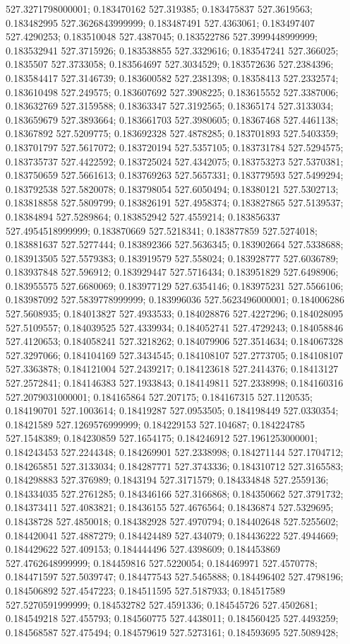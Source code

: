 527.3271798000001; 0.183470162 527.319385; 0.183475837 527.3619563; 0.183482995 527.3626843999999; 0.183487491 527.4363061; 0.183497407 527.4290253; 0.183510048 527.4387045; 0.183522786 527.3999448999999; 0.183532941 527.3715926; 0.183538855 527.3329616; 0.183547241 527.366025; 0.1835507 527.3733058; 0.183564697 527.3034529; 0.183572636 527.2384396; 0.183584417 527.3146739; 0.183600582 527.2381398; 0.18358413 527.2332574; 0.183610498 527.249575; 0.183607692 527.3908225; 0.183615552 527.3387006; 0.183632769 527.3159588; 0.18363347 527.3192565; 0.18365174 527.3133034; 0.183659679 527.3893664; 0.183661703 527.3980605; 0.18367468 527.4461138; 0.18367892 527.5209775; 0.183692328 527.4878285; 0.183701893 527.5403359; 0.183701797 527.5617072; 0.183720194 527.5357105; 0.183731784 527.5294575; 0.183735737 527.4422592; 0.183725024 527.4342075; 0.183753273 527.5370381; 0.183750659 527.5661613; 0.183769263 527.5657331; 0.183779593 527.5499294; 0.183792538 527.5820078; 0.183798054 527.6050494; 0.18380121 527.5302713; 0.183818858 527.5809799; 0.183826191 527.4958374; 0.183827865 527.5139537; 0.18384894 527.5289864; 0.183852942 527.4559214; 0.183856337 527.4954518999999; 0.183870669 527.5218341; 0.183877859 527.5274018; 0.183881637 527.5277444; 0.183892366 527.5636345; 0.183902664 527.5338688; 0.183913505 527.5579383; 0.183919579 527.558024; 0.183928777 527.6036789; 0.183937848 527.596912; 0.183929447 527.5716434; 0.183951829 527.6498906; 0.183955575 527.6680069; 0.183977129 527.6354146; 0.183975231 527.5566106; 0.183987092 527.5839778999999; 0.183996036 527.5623496000001; 0.184006286 527.5608935; 0.184013827 527.4933533; 0.184028876 527.4227296; 0.184028095 527.5109557; 0.184039525 527.4339934; 0.184052741 527.4729243; 0.184058846 527.4120653; 0.184058241 527.3218262; 0.184079906 527.3514634; 0.184067328 527.3297066; 0.184104169 527.3434545; 0.184108107 527.2773705; 0.184108107 527.3363878; 0.184121004 527.2439217; 0.184123618 527.2414376; 0.18413127 527.2572841; 0.184146383 527.1933843; 0.184149811 527.2338998; 0.184160316 527.2079031000001; 0.184165864 527.207175; 0.184167315 527.1120535; 0.184190701 527.1003614; 0.18419287 527.0953505; 0.184198449 527.0330354; 0.18421589 527.1269576999999; 0.184229153 527.104687; 0.184224785 527.1548389; 0.184230859 527.1654175; 0.184246912 527.1961253000001; 0.184243453 527.2244348; 0.184269901 527.2338998; 0.184271144 527.1704712; 0.184265851 527.3133034; 0.184287771 527.3743336; 0.184310712 527.3165583; 0.184298883 527.376989; 0.1843194 527.3171579; 0.184334848 527.2559136; 0.184334035 527.2761285; 0.184346166 527.3166868; 0.184350662 527.3791732; 0.184373411 527.4083821; 0.18436155 527.4676564; 0.18436874 527.5329695; 0.18438728 527.4850018; 0.184382928 527.4970794; 0.184402648 527.5255602; 0.184420041 527.4887279; 0.184424489 527.434079; 0.184436222 527.4944669; 0.184429622 527.409153; 0.184444496 527.4398609; 0.184453869 527.4762648999999; 0.184459816 527.5220054; 0.184469971 527.4570778; 0.184471597 527.5039747; 0.184477543 527.5465888; 0.184496402 527.4798196; 0.184506892 527.4547223; 0.184511595 527.5187933; 0.184517589 527.5270591999999; 0.184532782 527.4591336; 0.184545726 527.4502681; 0.184549218 527.455793; 0.184560775 527.4438011; 0.184560425 527.4493259; 0.184568587 527.475494; 0.184579619 527.5273161; 0.184593695 527.5089428; 
